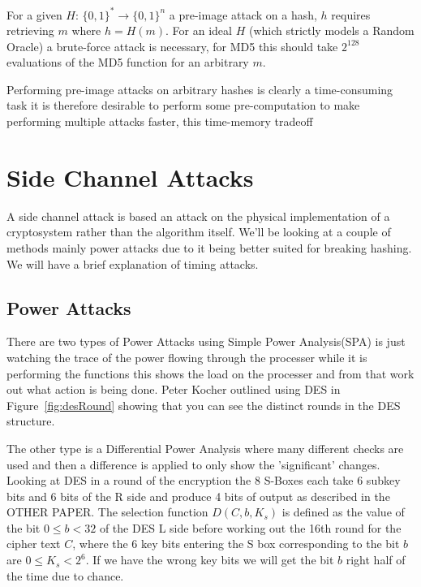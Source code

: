 \documentclass[a4paper,12pt]{article}
\begin{document}
For a given $H$: $\{0,1\}^* \rightarrow \{0,1\}^n$ a pre-image attack on a hash, $h$ requires retrieving $m$ where $h = H(m)$. For an ideal $H$ (which strictly models a Random Oracle) a brute-force attack is necessary, for MD5 this should take $2^{128}$ evaluations of the MD5 function for an arbitrary $m$.

Performing pre-image attacks on arbitrary hashes is clearly a time-consuming task it is therefore desirable to perform some pre-computation to make performing multiple attacks faster, this time-memory tradeoff 



\section{Side Channel Attacks}
A side channel attack is based an attack on the physical implementation of a cryptosystem rather than the algorithm itself. We'll be looking at a couple of methods mainly power attacks due to it being better suited for breaking hashing. We will have a brief explanation of timing attacks.

\subsection{Power Attacks}
There are two types of Power Attacks using Simple Power Analysis(SPA) is just watching the trace of the power flowing through the processer while it is performing the functions this shows the load on the processer and from that work out what action is being done. Peter Kocher outlined using DES in Figure~\ref{fig:desRound} showing that you can see the distinct rounds in the DES structure. 

The other type is a Differential Power Analysis where many different checks are used and then a difference is applied to only show the 'significant' changes. Looking at DES in a round of the encryption the 8 S-Boxes each take 6 subkey bits and 6 bits of the R side and produce 4 bits of output as described in the {\color{red} OTHER PAPER}. The selection function $D(C,b,K_s)$ is defined as the value of the bit $0 \le b < 32$ of the DES L side before working out the 16th round for the cipher text $C$, where the 6 key bits entering the S box corresponding to the bit $b$ are $0 \le K_s < 2^6$. If we have the wrong key bits we will get the bit $b$ right half of the time due to chance. 
\end{document}
